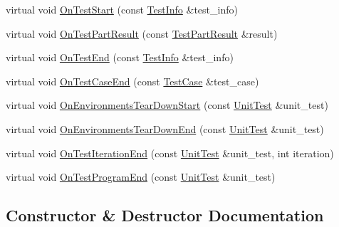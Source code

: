 \begin{DoxyCompactItemize}
\item 
virtual void \hyperlink{classtesting_1_1internal_1_1_test_event_repeater_a70d694ca5010cc86cd458f7f529e6fbe}{On\+Test\+Start} (const \hyperlink{classtesting_1_1_test_info}{Test\+Info} \&test\+\_\+info)
\item 
virtual void \hyperlink{classtesting_1_1internal_1_1_test_event_repeater_ac8fb21da6802b1ebab9cad3eee9150eb}{On\+Test\+Part\+Result} (const \hyperlink{classtesting_1_1_test_part_result}{Test\+Part\+Result} \&result)
\item 
virtual void \hyperlink{classtesting_1_1internal_1_1_test_event_repeater_aa0f13bded9369aae1c78583d7276f8b1}{On\+Test\+End} (const \hyperlink{classtesting_1_1_test_info}{Test\+Info} \&test\+\_\+info)
\item 
virtual void \hyperlink{classtesting_1_1internal_1_1_test_event_repeater_a0a335e1c3957a8c699ed56e37ea7b978}{On\+Test\+Case\+End} (const \hyperlink{classtesting_1_1_test_case}{Test\+Case} \&test\+\_\+case)
\item 
virtual void \hyperlink{classtesting_1_1internal_1_1_test_event_repeater_a30db75df2d9a65d787f31e16004613c2}{On\+Environments\+Tear\+Down\+Start} (const \hyperlink{classtesting_1_1_unit_test}{Unit\+Test} \&unit\+\_\+test)
\item 
virtual void \hyperlink{classtesting_1_1internal_1_1_test_event_repeater_a8428220c4cf9f0cea2dfd9a70f07ab7f}{On\+Environments\+Tear\+Down\+End} (const \hyperlink{classtesting_1_1_unit_test}{Unit\+Test} \&unit\+\_\+test)
\item 
virtual void \hyperlink{classtesting_1_1internal_1_1_test_event_repeater_a94253e3c11753328e8a031f39352708f}{On\+Test\+Iteration\+End} (const \hyperlink{classtesting_1_1_unit_test}{Unit\+Test} \&unit\+\_\+test, int iteration)
\item 
virtual void \hyperlink{classtesting_1_1internal_1_1_test_event_repeater_a4622616259747dbcc23f5ee39ef99ec0}{On\+Test\+Program\+End} (const \hyperlink{classtesting_1_1_unit_test}{Unit\+Test} \&unit\+\_\+test)
\end{DoxyCompactItemize}


\subsection{Constructor \& Destructor Documentation}
\hypertarget{classtesting_1_1internal_1_1_test_event_repeater_a97dc3b08bd62c615f16e4c73ed0b3894}{}
